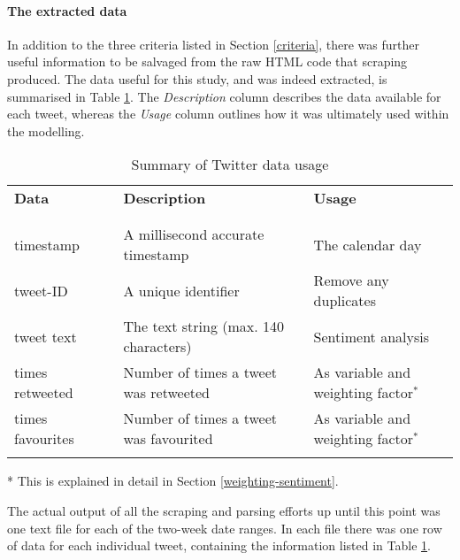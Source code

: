 \documentclass{article}
\begin{document}
\pagebreak


\paragraph{The extracted data}
\label{sec-3-3-4-2}

In addition to the three criteria listed in Section \ref{criteria}, there was further useful information to be salvaged from the raw HTML code that scraping produced. The data useful for this study, and was indeed extracted, is summarised in Table \ref{table:twitter-data-usage}. The \emph{Description} column describes the data available for each tweet, whereas the \emph{Usage} column outlines how it was ultimately used within the modelling.

\vspace{3mm}

\begin{table}[htb]
\centering
\begin{tabular}{lllll}
\textbf{Data} &  & \textbf{Description} &  & \textbf{Usage}\\
 &  &  &  & \\
\hline
 &  &  &  & \\
timestamp &  & A millisecond accurate timestamp &  & The calendar day\\
tweet-ID &  & A unique identifier &  & Remove any duplicates\\
tweet text &  & The text string (max. 140 characters) &  & Sentiment analysis\\
times retweeted &  & Number of times a tweet was retweeted &  & As variable and weighting factor$^{\text{*}}$\\
times favourites &  & Number of times a tweet was favourited &  & As variable and weighting factor$^{\text{*}}$\\
 &  &  &  & \\
\end{tabular}\caption{\label{table:twitter-data-usage}Summary of Twitter data usage}

\end{table}

\mbox{*} This is explained in detail in Section \ref{weighting-sentiment}. 

\vspace{5mm}

The actual output of all the scraping and parsing efforts up until this point was one text file for each of the two-week date ranges. In each file there was one row of data for each individual tweet, containing the information listed in Table \ref{table:twitter-data-usage}.
\end{document}

